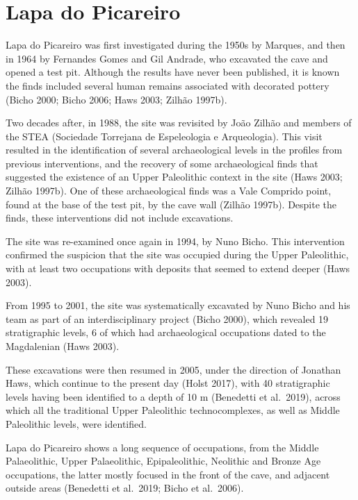 \documentclass[12pt,twoside]{reedthesis}
\begin{document}
\hypertarget{lapa-do-picareiro-1}{%
\section{Lapa do Picareiro}\label{lapa-do-picareiro-1}}

Lapa do Picareiro was first investigated during the 1950s by Marques, and then in 1964 by Fernandes Gomes and Gil Andrade, who excavated the cave and opened a test pit. Although the results have never been published, it is known the finds included several human remains associated with decorated pottery (Bicho 2000; Bicho 2006; Haws 2003; Zilhão 1997b).

Two decades after, in 1988, the site was revisited by João Zilhão and members of the STEA (Sociedade Torrejana de Espeleologia e Arqueologia). This visit resulted in the identification of several archaeological levels in the profiles from previous interventions, and the recovery of some archaeological finds that suggested the existence of an Upper Paleolithic context in the site (Haws 2003; Zilhão 1997b). One of these archaeological finds was a Vale Comprido point, found at the base of the test pit, by the cave wall (Zilhão 1997b). Despite the finds, these interventions did not include excavations.

The site was re-examined once again in 1994, by Nuno Bicho. This intervention confirmed the suspicion that the site was occupied during the Upper Paleolithic, with at least two occupations with deposits that seemed to extend deeper (Haws 2003).

From 1995 to 2001, the site was systematically excavated by Nuno Bicho and his team as part of an interdisciplinary project (Bicho 2000), which revealed 19 stratigraphic levels, 6 of which had archaeological occupations dated to the Magdalenian (Haws 2003).

These excavations were then resumed in 2005, under the direction of Jonathan Haws, which continue to the present day (Holst 2017), with 40 stratigraphic levels having been identified to a depth of 10 m (Benedetti et al.~2019), across which all the traditional Upper Paleolithic technocomplexes, as well as Middle Paleolithic levels, were identified.

Lapa do Picareiro shows a long sequence of occupations, from the Middle Palaeolithic, Upper Palaeolithic, Epipaleolithic, Neolithic and Bronze Age occupations, the latter mostly focused in the front of the cave, and adjacent outside areas (Benedetti et al.~2019; Bicho et al.~2006).
\end{document}
